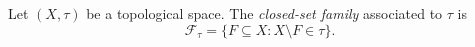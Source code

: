 \begin{definition}\label{def:closed-set-family-of-topology}
Let \((X,\tau)\) be a topological space.  The \emph{closed-set family}
associated to \(\tau\) is
\[
\mathcal{F}_{\tau}
=
\{F\subseteq X:X\setminus F\in\tau\}.
\]
\end{definition}